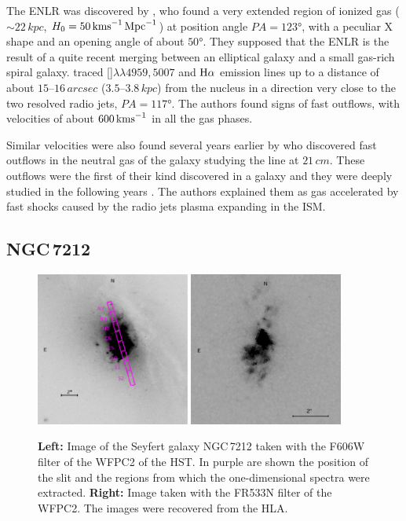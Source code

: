 \documentclass[../main.tex]{subfiles}
\begin{document}
The ENLR was discovered by \citet{Colina91}, who found a very extended region of ionized gas ($\sim 22\,\si{kpc}$, $H_0 =50\,\si{\kms.Mpc^{-1}}$) at position angle $PA = \ang{123}$, with a peculiar X shape and an opening angle of about $\ang{50}$. 
They supposed that the ENLR is the result of a quite recent merging between an elliptical galaxy and a small gas-rich spiral galaxy. 
\citet{Morganti07} traced []$\lambda\lambda4959, 5007$ and $\Ha$ emission lines up to a distance of about $15$--$16\,\si{arcsec}$ ($3.5$--$3.8\,\si{kpc}$) from the nucleus in a direction very close to the two resolved radio jets, $PA = \ang{117}$. 
The authors found signs of fast outflows, with velocities of about $600\,\si{\kms}$ in all the gas phases.

Similar velocities were also found several years earlier by \citet{Morganti98} who discovered fast outflows in the neutral gas of the galaxy studying the  line at $21\,\si{cm}$.
These outflows were the first of their kind discovered in a galaxy and they were deeply studied in the following years \citep{Morganti07,Tadhunter14,Morganti15}.
The authors explained them as gas accelerated by fast shocks caused by the radio jets plasma expanding in the ISM.


\subsection{NGC\,7212}
\label{sec:NGC7212}

\begin{figure}
\centering
\includegraphics[width=0.45\textwidth]{images/paper1/ngc7212slit.jpg} 
\quad
\includegraphics[width=0.45\textwidth]{images/paper1/NGC7212_o3_2.pdf}
\caption[]{\textbf{Left:} Image of the Seyfert galaxy NGC\,7212 taken with the F606W filter of the WFPC2 of the HST. In purple are shown the position of the slit and the regions from which the one-dimensional spectra were extracted. \textbf{Right:} Image taken with the FR533N filter of the WFPC2. The images were recovered from the HLA.
}
\label{fig:NGC7212}
\end{figure}
\end{document}
